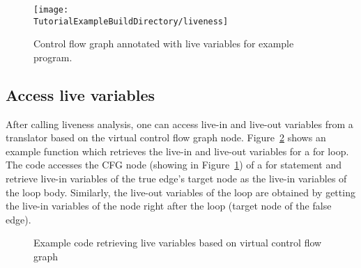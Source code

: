 \begin{figure}
\texttt{[image: \\TutorialExampleBuildDirectory/liveness]}
\caption{Control flow graph annotated with live variables for example program.}
\label{Tutorial:exampleLivenessCFG}
\end{figure}

%
%   
%
%   
%


\subsection{Access live variables}
After calling liveness analysis, one can access live-in and live-out variables from a translator
based on the virtual control flow graph node.
Figure~\ref{Tutorial:livenessCode2} shows an example function which
retrieves the live-in and live-out variables for a for loop.
The code accesses the CFG node (showing in
Figure~\ref{Tutorial:exampleLivenessCFG}) of a for statement and retrieve
live-in variables of the true edge's target node as the live-in variables
of the loop body. 
Similarly, the live-out variables of the loop are obtained by getting
the live-in variables of the node right after the loop (target node of the
false edge).

\begin{figure}[!h]
{\indent
{\mySmallFontSize
\begin{latexonly}
   
\end{latexonly}

\begin{htmlonly}
   
\end{htmlonly}

}
}
\caption{Example code retrieving live variables based on virtual control flow graph}
\label{Tutorial:livenessCode2}
\end{figure}


